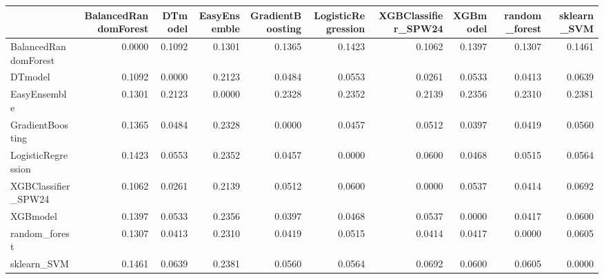 \begin{tabular}{lrrrrrrrrr}
\toprule
 & BalancedRandomForest & DTmodel & EasyEnsemble & GradientBoosting & LogisticRegression & XGBClassifier_SPW24 & XGBmodel & random_forest & sklearn_SVM \\
\midrule
BalancedRandomForest & 0.0000 & 0.1092 & 0.1301 & 0.1365 & 0.1423 & 0.1062 & 0.1397 & 0.1307 & 0.1461 \\
DTmodel & 0.1092 & 0.0000 & 0.2123 & 0.0484 & 0.0553 & 0.0261 & 0.0533 & 0.0413 & 0.0639 \\
EasyEnsemble & 0.1301 & 0.2123 & 0.0000 & 0.2328 & 0.2352 & 0.2139 & 0.2356 & 0.2310 & 0.2381 \\
GradientBoosting & 0.1365 & 0.0484 & 0.2328 & 0.0000 & 0.0457 & 0.0512 & 0.0397 & 0.0419 & 0.0560 \\
LogisticRegression & 0.1423 & 0.0553 & 0.2352 & 0.0457 & 0.0000 & 0.0600 & 0.0468 & 0.0515 & 0.0564 \\
XGBClassifier_SPW24 & 0.1062 & 0.0261 & 0.2139 & 0.0512 & 0.0600 & 0.0000 & 0.0537 & 0.0414 & 0.0692 \\
XGBmodel & 0.1397 & 0.0533 & 0.2356 & 0.0397 & 0.0468 & 0.0537 & 0.0000 & 0.0417 & 0.0600 \\
random_forest & 0.1307 & 0.0413 & 0.2310 & 0.0419 & 0.0515 & 0.0414 & 0.0417 & 0.0000 & 0.0605 \\
sklearn_SVM & 0.1461 & 0.0639 & 0.2381 & 0.0560 & 0.0564 & 0.0692 & 0.0600 & 0.0605 & 0.0000 \\
\bottomrule
\end{tabular}
